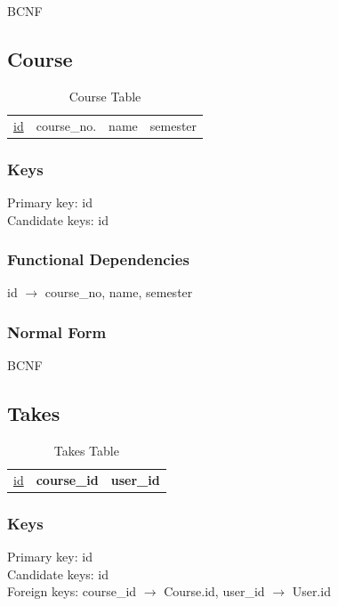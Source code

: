 \documentclass[11pt]{article}
\begin{document}
    
    BCNF
\subsection{Course}
\label{sec-3-5}

   
\begin{table}[htb]
\caption{Course Table} 
\begin{center}
\begin{tabular}{llll}
 \underline{id}  &  course\_no.  &  name  &  semester  \\
\end{tabular}
\end{center}
\end{table}
\subsubsection{Keys}
\label{sec-3-5-1}

    
    Primary key: id\\
    Candidate keys: id
\subsubsection{Functional Dependencies}
\label{sec-3-5-2}


    id $\rightarrow$ course\_no, name, semester
\subsubsection{Normal Form}
\label{sec-3-5-3}


    BCNF
\subsection{Takes}
\label{sec-3-6}


\begin{table}[htb]
\caption{Takes Table} 
\begin{center}
\begin{tabular}{lll}
 \underline{id}  &  \textbf{course\_id}  &  \textbf{user\_id}  \\
\end{tabular}
\end{center}
\end{table}
\subsubsection{Keys}
\label{sec-3-6-1}

    
    Primary key: id\\    
    Candidate keys: id\\
    Foreign keys: course\_id $\rightarrow$ Course.id, user\_id $\rightarrow$ User.id
\end{document}

